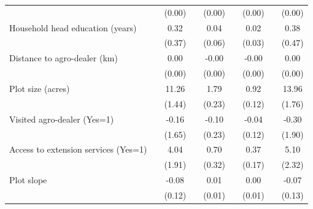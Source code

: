 {\begin{tabular}{l*{8}{c}}
                &                  &   (0.00)         &                  &   (0.00)         &                  &   (0.00)         &                  &   (0.00)         \\
Household head education (years)&                  &     0.32         &                  &     0.04         &                  &     0.02         &                  &     0.38         \\
                &                  &   (0.37)         &                  &   (0.06)         &                  &   (0.03)         &                  &   (0.47)         \\
Distance to agro-dealer (km)&                  &     0.00         &                  &    -0.00         &                  &    -0.00         &                  &     0.00         \\
                &                  &   (0.00)         &                  &   (0.00)         &                  &   (0.00)         &                  &   (0.00)         \\
Plot size (acres)&                  &    11.26\sym{***}&                  &     1.79\sym{***}&                  &     0.92\sym{***}&                  &    13.96\sym{***}\\
                &                  &   (1.44)         &                  &   (0.23)         &                  &   (0.12)         &                  &   (1.76)         \\
Visited agro-dealer (Yes=1)&                  &    -0.16         &                  &    -0.10         &                  &    -0.04         &                  &    -0.30         \\
                &                  &   (1.65)         &                  &   (0.23)         &                  &   (0.12)         &                  &   (1.90)         \\
Access to extension services (Yes=1)&                  &     4.04\sym{**} &                  &     0.70\sym{**} &                  &     0.37\sym{**} &                  &     5.10\sym{**} \\
                &                  &   (1.91)         &                  &   (0.32)         &                  &   (0.17)         &                  &   (2.32)         \\
Plot slope      &                  &    -0.08         &                  &     0.01         &                  &     0.00         &                  &    -0.07         \\
                &                  &   (0.12)         &                  &   (0.01)         &                  &   (0.01)         &                  &   (0.13)         \\

\end{tabular}}
